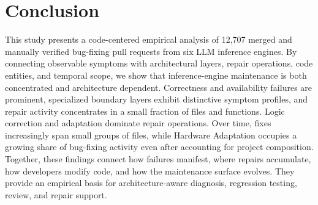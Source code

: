 \section{Conclusion}
\label{sec:conclusion}

This study presents a code-centered empirical analysis of 12,707 merged and manually verified bug-fixing pull requests from six LLM inference engines. By connecting observable symptoms with architectural layers, repair operations, code entities, and temporal scope, we show that inference-engine maintenance is both concentrated and architecture dependent. Correctness and availability failures are prominent, specialized boundary layers exhibit distinctive symptom profiles, and repair activity concentrates in a small fraction of files and functions. Logic correction and adaptation dominate repair operations. Over time, fixes increasingly span small groups of files, while Hardware Adaptation occupies a growing share of bug-fixing activity even after accounting for project composition. Together, these findings connect how failures manifest, where repairs accumulate, how developers modify code, and how the maintenance surface evolves. They provide an empirical basis for architecture-aware diagnosis, regression testing, review, and repair support.
